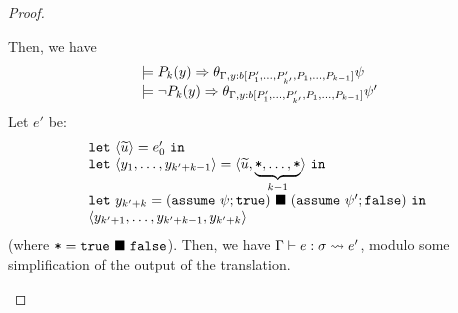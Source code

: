 \begin{proof}
\begin{itemize}
Then, we have
\[
\begin{array}{l}
\models P_k(y) \Rightarrow \theta_{\Gamma,y\mathbin{:} b[P_1',\ldots,P'_{k'},P_1,\ldots,P_{k-1}]}\psi\\
\models \neg P_k(y) \Rightarrow \theta_{\Gamma,y\mathbin{:} b[P_1',\ldots,P'_{k'},P_1,\ldots,P_{k-1}]}\psi'\\
\end{array}
\]
Let \(e'\) be:
\[
\begin{array}{l}
\mathtt{let~}\langle{\widetilde{u}}\rangle=e_0'\mathtt{~in~}\\
\mathtt{let~}\langle{y_1,\ldots,y_{k'+k-1}}\rangle=\langle{\widetilde{u},\underbrace{\texttt{*},\ldots,\texttt{*}}_{k-1}}\rangle\mathtt{~in~}\\
\mathtt{let~}y_{k'+k}=(\mathtt{assume~}\psi; \mathtt{true})\ \blacksquare\ (\mathtt{assume~}\psi'; \mathtt{false})\mathtt{~in~}\\
  {\langle{y_{k'+1},\ldots,y_{k'+k-1},y_{k'+k}}\rangle}
\end{array}
\]
(where \(\texttt{*} = \mathtt{true}\ \blacksquare\ \mathtt{false}\)).
Then, we have
\(\Gamma \vdash e : \sigma \leadsto e'\), modulo some simplification of the output of the translation.

\end{itemize}
\end{proof}
